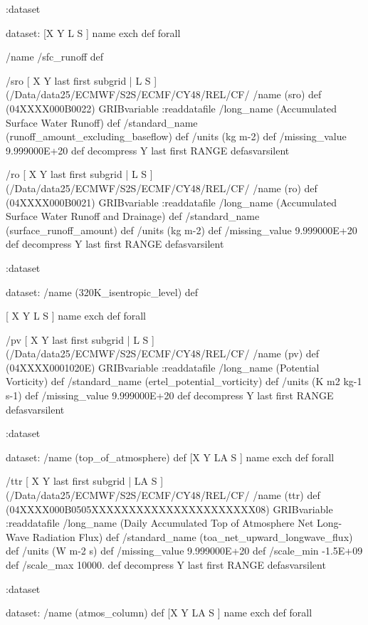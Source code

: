 \begin{ingrid}
:dataset

dataset:
[X Y L S ] {name exch def } forall

/name /sfc_runoff def

/sro { [ X Y last first subgrid | L S ] (/Data/data25/ECMWF/S2S/ECMF/CY48/REL/CF/%
/name (sro) def
(04XXXX000B0022) GRIBvariable
:readdatafile
/long_name (Accumulated Surface Water Runoff) def
/standard_name (runoff_amount_excluding_baseflow) def
/units (kg m-2) def
/missing_value 9.999000E+20 def
decompress
Y last first RANGE
} defasvarsilent

/ro { [ X Y last first subgrid | L S ] (/Data/data25/ECMWF/S2S/ECMF/CY48/REL/CF/%
/name (ro) def
(04XXXX000B0021) GRIBvariable
:readdatafile
/long_name (Accumulated Surface Water Runoff and Drainage) def
/standard_name (surface_runoff_amount) def
/units (kg m-2) def
/missing_value 9.999000E+20 def
decompress
Y last first RANGE
} defasvarsilent

:dataset


dataset:
/name (320K_isentropic_level) def

[ X Y L S ] { name exch def } forall

/pv { [ X Y last first subgrid | L S ] (/Data/data25/ECMWF/S2S/ECMF/CY48/REL/CF/%
/name (pv) def
(04XXXX0001020E) GRIBvariable
:readdatafile
/long_name (Potential Vorticity) def
/standard_name (ertel_potential_vorticity) def
/units (K m2 kg-1 s-1) def
/missing_value 9.999000E+20 def
decompress
Y last first RANGE
} defasvarsilent

:dataset


dataset:
/name (top_of_atmosphere) def
[X Y LA S ] {name exch def } forall

/ttr { [ X Y last first subgrid | LA S ] (/Data/data25/ECMWF/S2S/ECMF/CY48/REL/CF/%
/name (ttr) def
(04XXXX000B0505XXXXXXXXXXXXXXXXXXXXXX08) GRIBvariable
:readdatafile
/long_name (Daily Accumulated Top of Atmosphere Net Long-Wave Radiation Flux) def
/standard_name (toa_net_upward_longwave_flux) def
/units (W m-2 s) def
/missing_value 9.999000E+20 def
/scale_min -1.5E+09 def
/scale_max 10000. def
decompress
Y last first RANGE
} defasvarsilent

:dataset

dataset:
/name (atmos_column) def
[X Y LA S ] {name exch def } forall


\end{ingrid}

